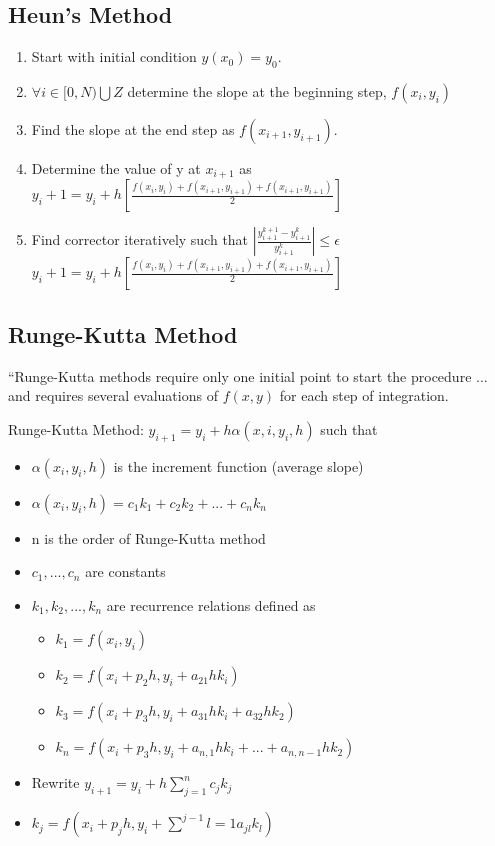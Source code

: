 \documentclass[11pt]{article}
\begin{document}
\subsection {Heun's Method }
\begin{enumerate}
\item Start with initial condition $y(x_0) = y_0$.
\item $\forall i \in [0,N) \bigcup Z $ determine the slope at the beginning step, $f(x_i, y_i)$
\item Find the slope at the end step as $f(x_{i+1}, y_{i+1})$.
\item Determine the value of y at $x_{i+1}$ as $y_i+1 = y_i + h [\frac {f(x_i , y_i) + f(x_{i+1} , y_{i+1}) + f(x_{i+1} , y_{i+1})} {2}]$
\item Find corrector iteratively such that $|\frac{y^{k+1}_{i+1} - y^k_{i+1}}{y^k_{i+1}} | \le \epsilon $  $y_i+1 = y_i + h [\frac {f(x_i , y_i) + f(x_{i+1} , y_{i+1}) + f(x_{i+1} , y_{i+1})} {2}]$

\end{enumerate}
\subsection {Runge-Kutta Method}
``Runge-Kutta methods require only one initial point to start the procedure ... and requires several evaluations of $f(x,y)$ for each step of integration. 

Runge-Kutta Method: $y_{i+1} = y_i +h \alpha (x,i , y_i , h)$ such that
\begin{itemize}
\item $\alpha (x_i , y_i, h)$ is the increment function (average slope) 
\item $\alpha (x_i, y_i, h) = c_1 k_1 + c_2 k_2 + ... + c_n k_n $
\item n is the order of Runge-Kutta method 
\item $c_1 , ... , c_n$ are constants
\item $k_1, k_2, ..., k_n $ are recurrence relations defined as 
\begin{itemize}
\item $k_1 = f(x_i, y_i) $
\item $k_2 = f(x_i + p_2 h, y_i + a_21 hk_i)$ 
\item $k_3 = f(x_i + p_3 h, y_i + a_31 hk_i + a_32hk_2)$ 
\item $k_n = f(x_i + p_3 h, y_i + a_{n,1} hk_i + ... + a_{n,n-1}hk_2)$ 

\end{itemize}
\item Rewrite $y_{i+1} = y_i + h \sum ^n_{j=1} c_j k_j $
\item $k_j = f(x_i +p_j h, y_i + \sum ^{j-1}{l=1}a_{jl} k_l  )$ 
\end{itemize}
\end{document}
